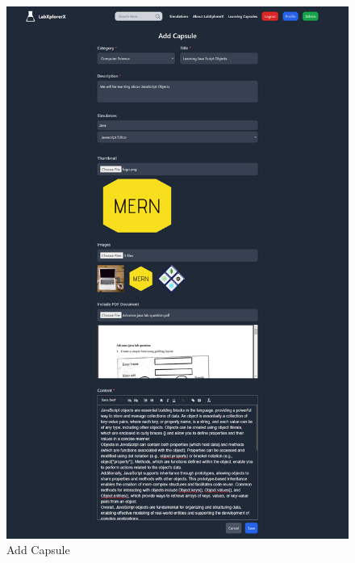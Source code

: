  \begin{figure}[H]
    \centering
     \includegraphics[width = 15cm]{Diagrams/output/addcapsule.png}
     \caption{Add Capsule}
 \end{figure}
